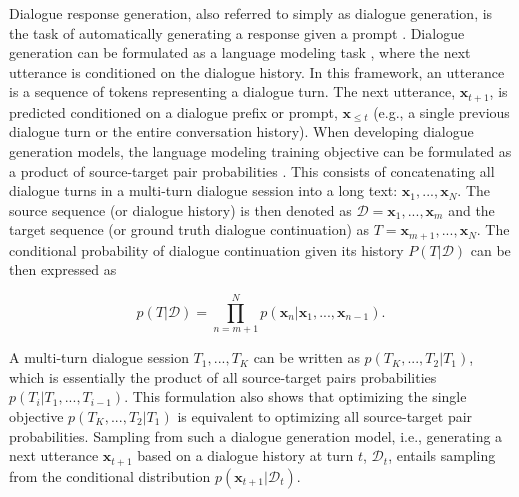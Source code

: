 Dialogue response generation, also referred to simply as dialogue generation, is the task of automatically generating a response given a prompt \citep{madotto-etal-2020-plug}. 
Dialogue generation can be formulated as a language modeling task \citep{welleck-etal-2019-dialogue}, where the next utterance is conditioned on the dialogue history.
In this framework, an utterance is a sequence of tokens representing a dialogue turn. The next utterance, $\textbf{x}_{t + 1}$, is predicted conditioned on a dialogue prefix or prompt, $\textbf{x}_{\leq t}$ (e.g., a single previous dialogue turn or the entire conversation history). 
When developing dialogue generation models, the language modeling training objective can be formulated as a product of source-target pair probabilities \citep{zhang2019dialogpt}. This consists of concatenating all dialogue turns in a multi-turn dialogue session into a long text: $\textbf{x}_1, ..., \textbf{x}_N$. The source sequence (or dialogue history) is then denoted as $\mathcal{D} = \textbf{x}_1, ..., \textbf{x}_m$ and the target sequence (or ground truth dialogue continuation) as $T = \textbf{x}_{m + 1}, ..., \textbf{x}_N$. The conditional probability of dialogue continuation given its history $P(T | \mathcal{D})$ can be then expressed as

\begin{equation}
    p(T | \mathcal{D}) = \prod_{n = m + 1}^N p(\textbf{x}_n | \textbf{x}_1, ..., \textbf{x}_{n - 1}).
\end{equation}

A multi-turn dialogue session $T_1, ..., T_K$ can be written as $p(T_K, ..., T_2 | T_1)$, which is essentially the product of all source-target pairs probabilities $p(T_i | T_1, ..., T_{i - 1})$. This formulation also shows that optimizing the single objective $p(T_K, ..., T_2 | T_1)$ is equivalent to optimizing all source-target pair probabilities. Sampling from such a dialogue generation model, i.e., generating a next utterance $\textbf{x}_{t + 1}$ based on a dialogue history at turn $t$, $\mathcal{D}_t$, entails sampling from the conditional distribution $p(\textbf{x}_{t + 1} | \mathcal{D}_t)$.

